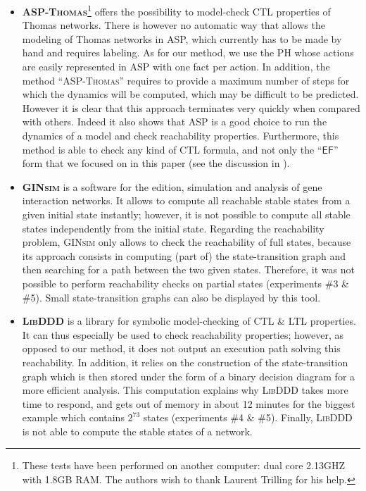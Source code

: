 \begin{itemize}

\item \textbf{\textsc{ASP-Thomas}}\footnote{These tests have been performed on another computer: dual core 2.13GHZ with 1.8GB RAM. The authors wish to thank Laurent Trilling for his help.}
offers the possibility to model-check CTL properties of Thomas networks. 
There is however no automatic way that allows the modeling of Thomas networks in ASP, which currently has to be made by hand and requires labeling. As for our method, we use the PH whose actions are easily represented in ASP with one fact per action.
In addition, the method ``\textsc{ASP-Thomas}'' requires to provide a maximum number of steps
for which the dynamics will be computed, which may be difficult to be predicted.
However it is clear that this approach terminates very quickly when compared with others.
Indeed it also shows that ASP is a good choice to run the dynamics of a model and check reachability properties.
Furthermore, this method is able to check any kind of CTL formula,
and not only the ``$\mathsf{EF}$'' form that we focused on in this paper
(see the discussion in ).

\item \textbf{\textsc{GINsim}} is a software for the edition, simulation and analysis
of gene interaction networks.
It allows to compute all reachable stable states from a given initial state instantly;
however, it is not possible to compute all stable states independently from the initial state.
Regarding the reachability problem, \textsc{GINsim} only allows to check the reachability of
full states, because its approach consists in computing
(part of) the state-transition graph and then searching for a path between the two given states.
Therefore, it was not possible to perform reachability checks on partial states
(experiments \#3 \& \#5).
Small state-transition graphs can also be displayed by this tool.

\item \textbf{\textsc{LibDDD}}
is a library for symbolic model-checking of CTL \& LTL properties.
It can thus especially be used to check reachability properties;
however, as opposed to our method, it does not output an execution path
solving this reachability.
In addition, it relies on the construction of the state-transition graph
which is then stored under the form of a binary decision diagram for a more efficient analysis.
This computation explains why \textsc{LibDDD} takes more time to respond,
and gets out of memory in about 12 minutes for the biggest example
which contains $2^{73}$ states
(experiments \#4 \& \#5).
Finally, \textsc{LibDDD} is not able to compute the stable states of a network.


\end{itemize}

